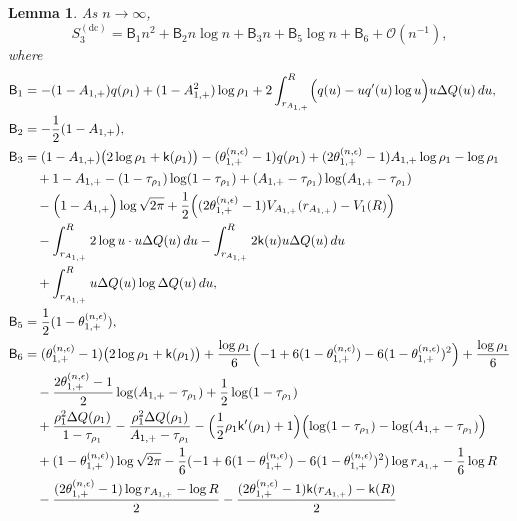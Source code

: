 \documentclass[a4paper]{article}
\newtheorem{lemma}[theorem]{Lemma}
\numberwithin{equation}{section}
\begin{document}
\begin{lemma}
\label{lemma:asymptotic expansion of S3dc}
As $n\to\infty$,
\begin{equation}
S_3^{(\mathrm{dc})}=\mathsf{B}_{1}n^2
+
\mathsf{B}_{2}n\log n
+
\mathsf{B}_{3}n
+
\mathsf{B}_{5}\log n
+
\mathsf{B}_{6}
+
\mathcal{O}(n^{-1}),
\end{equation}
where 
\begin{align*}
\mathsf{B}_{1}&=-(1-A_{1,+})q(\rho_1)+(1-A_{1,+}^2)\log\rho_1+2\int_{r_{A_{1,+}}}^{R}\Bigl(
q(u)-uq'(u)\log u
\Bigr)u\Delta Q(u)\,du,
\\
\mathsf{B}_{2}&=-\frac{1}{2}(1-A_{1,+}),
\\
\mathsf{B}_{3}&=
(1-A_{1,+})\bigl(2\log\rho_1+\mathsf{k}(\rho_1)\bigr)
-(\theta_{1,+}^{(n,\epsilon)}-1)q(\rho_1)
+(2\theta_{1,+}^{(n,\epsilon)}-1)A_{1,+}\log\rho_1-\log\rho_1
\\
&\quad 
+
1-A_{1,+}-(1-\tau_{\rho_1})\log(1-\tau_{\rho_1})+(A_{1,+}-\tau_{\rho_1})\log(A_{1,+}-\tau_{\rho_1})
\\
&\quad
-\Bigl(1-A_{1,+}\Bigr)\log\sqrt{2\pi}
+\frac{1}{2}\Bigl((2\theta_{1,+}^{(n,\epsilon)}-1)V_{A_{1,+}}(r_{A_{1,+}})-V_{1}(R)\Bigr)
\\
&\quad
-\int_{r_{A_{1,+}}}^{R}2\log u\cdot u\Delta Q(u)\,du
-\int_{r_{A_{1,+}}}^{R}2\mathsf{k}(u)u\Delta Q(u)\,du
\\
&\quad
+\int_{r_{A_{1,+}}}^{R}u\Delta Q(u)\log \Delta Q(u)\,du,
\\
\mathsf{B}_{5}&=\frac{1}{2}(1-\theta_{1,+}^{(n,\epsilon)}),
\\
\mathsf{B}_{6}&=(\theta_{1,+}^{(n,\epsilon)}-1)\bigl(2\log\rho_1+\mathsf{k}(\rho_1)\bigr)
+\frac{\log\rho_1}{6}\Bigl(-1+6(1-\theta_{1,+}^{(n,\epsilon)})-6(1-\theta_{1,+}^{(n,\epsilon)})^2 \Bigr)+\frac{\log\rho_1}{6}
\\
&\quad 
-\frac{2\theta_{1,+}^{(n,\epsilon)}-1}{2}\log(A_{1,+}-\tau_{\rho_1})+\frac{1}{2}\log(1-\tau_{\rho_1})
\\
&\quad 
+\frac{\rho_1^2\Delta Q(\rho_1)}{1-\tau_{\rho_1}}-\frac{\rho_1^2\Delta Q(\rho_1)}{A_{1,+}-\tau_{\rho_1}}
-\Bigl(\frac{1}{2}\rho_1\mathsf{k}'(\rho_1)+1\Bigr)\Bigl(\log(1-\tau_{\rho_1})-\log(A_{1,+}-\tau_{\rho_1})\Bigr)
\\
&\quad 
+(1-\theta_{1,+}^{(n,\epsilon)})\log\sqrt{2\pi}
-\frac{1}{6}(-1+6(1-\theta_{1,+}^{(n,\epsilon)})-6(1-\theta_{1,+}^{(n,\epsilon)})^2)\log r_{A_{1,+}}
-\frac{1}{6}\log R
\\
&\quad
-\frac{(2\theta_{1,+}^{(n,\epsilon)}-1)\log r_{A_{1,+}}-\log R}{2}
-\frac{(2\theta_{1,+}^{(n,\epsilon)}-1)\mathsf{k}(r_{A_{1,+}})-\mathsf{k}(R)}{2}

\end{align*}
\end{lemma}
\end{document}

